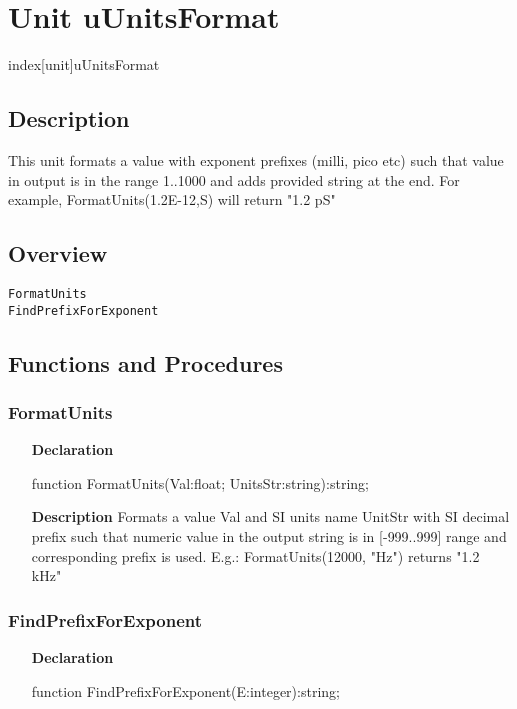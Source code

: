 \documentclass[12pt,a4paper,oneside]{report}
\newcommand{\lmath}[1]{   %
	\marginpar{\vspace{#1} 
		\begin{flushright}
			LMath
	\end{flushright} }
}
\newcommand{\declarationitem}[1]{\textbf{#1}}
\newcommand{\descriptiontitle}[1]{\textbf{#1}}
\begin{document}
\section{Unit uUnitsFormat}\lmath{-24pt}
\label{lmunitsformat}
index[unit]{uUnitsFormat}
\subsection{Description}
This unit formats a value with exponent prefixes (milli, pico etc) such that value in output is in the range 1..1000 and adds provided string at the end. For example, FormatUnits(1.2E{-}12,S) will return "1.2 pS"
\subsection{Overview}
\begin{description}
	\item[\texttt{FormatUnits}]
	\item[\texttt{FindPrefixForExponent}]
\end{description}
\subsection{Functions and Procedures}
\subsubsection{FormatUnits}
\label{lmunitsformat-FormatUnits}
\begin{itemize}\item[\declarationitem{Declaration}\hfill]
	\begin{flushleft}
		\begin{ttfamily}
			function FormatUnits(Val:float; UnitsStr:string):string;\end{ttfamily}
		
	\end{flushleft}
	
	\par
	\item[\descriptiontitle{Description}]
	Formats a value Val and SI units name UnitStr with SI decimal prefix such that numeric value in the output string is in [{-}999..999] range and corresponding prefix is used. E.g.: FormatUnits(12000, "Hz") returns "1.2 kHz"
	
\end{itemize}
\subsubsection{FindPrefixForExponent}
\label{lmunitsformat-FindPrefixForExponent}
\begin{itemize}\item[\declarationitem{Declaration}\hfill]
	\begin{flushleft}
		\begin{ttfamily}
			function FindPrefixForExponent(E:integer):string;\end{ttfamily}
		
	\end{flushleft}
	
\end{itemize}
\end{document}
